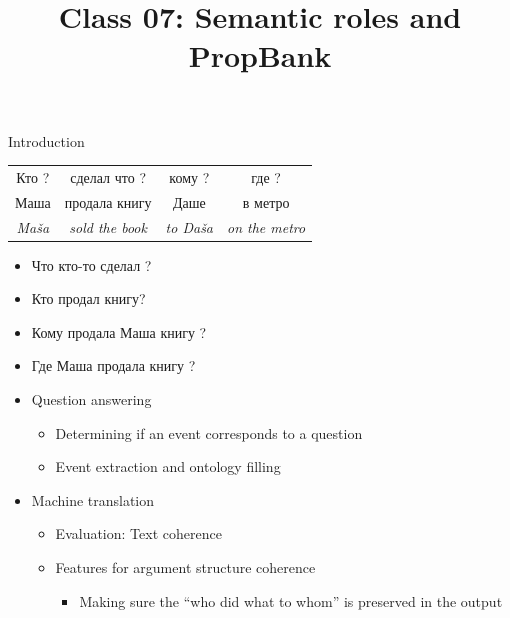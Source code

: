 \documentclass[10pt, compress]{beamer}
\title{Class 07: Semantic roles and PropBank}
\date{}
\begin{document}
\maketitle

\begin{frame}{Introduction}


\begin{center}
\begin{tabular}{cccc}
  Кто ?      &   сделал что ? & кому ? & где ? \\
{\Large Маша} & {\Large продала книгу} & {\Large Даше} & {\Large в метро} \\
 \emph{Maša} & \emph{sold the book} & \emph{to Daša} & \emph{on the metro} \\
\end{tabular}
\end{center}

\begin{itemize}
  \item Что кто-то сделал ?
  \item Кто продал книгу? 
  \item Кому продала Маша книгу ?
  \item Где Маша продала книгу ?
\end{itemize}

\end{frame}

\begin{frame}

\begin{itemize}
  \item Question answering 
  \begin{itemize}
    \item Determining if an event corresponds to a question
    \item Event extraction and ontology filling
  \end{itemize}
  \item Machine translation
  \begin{itemize}
     \item Evaluation: Text coherence
     \item Features for argument structure coherence
     \begin{itemize}
       \item Making sure the ``who did what to whom'' is preserved in the output
     \end{itemize}
  \end{itemize}
\end{itemize} 

\end{frame}
\end{document}
